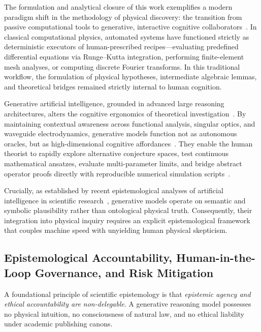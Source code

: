 \documentclass[11pt,a4paper]{article}
\begin{document}
The formulation and analytical closure of this work exemplifies a modern paradigm shift in the methodology of physical discovery: the transition from passive computational tools to generative, interactive cognitive collaborators~\cite{OToole2024,VillaescusaNavarro2026}. In classical computational physics, automated systems have functioned strictly as deterministic executors of human-prescribed recipes---evaluating predefined differential equations via Runge--Kutta integration, performing finite-element mesh analyses, or computing discrete Fourier transforms. In this traditional workflow, the formulation of physical hypotheses, intermediate algebraic lemmas, and theoretical bridges remained strictly internal to human cognition.

Generative artificial intelligence, grounded in advanced large reasoning architectures, alters the cognitive ergonomics of theoretical investigation~\cite{OToole2024,Haber2025,Jauhiainen2026}. By maintaining contextual awareness across functional analysis, singular optics, and waveguide electrodynamics, generative models function not as autonomous oracles, but as high-dimensional cognitive affordances~\cite{OToole2024,VillaescusaNavarro2026}. They enable the human theorist to rapidly explore alternative conjecture spaces, test continuous mathematical ansatzes, evaluate multi-parameter limits, and bridge abstract operator proofs directly with reproducible numerical simulation scripts~\cite{Zhu2026PaperBanana}.

Crucially, as established by recent epistemological analyses of artificial intelligence in scientific research~\cite{Haber2025,Jauhiainen2026}, generative models operate on semantic and symbolic plausibility rather than ontological physical truth. Consequently, their integration into physical inquiry requires an explicit epistemological framework that couples machine speed with unyielding human physical skepticism.

\subsection{Epistemological Accountability, Human-in-the-Loop Governance, and Risk Mitigation}
\label{subsec:epistemic_accountability}

A foundational principle of scientific epistemology is that \emph{epistemic agency and ethical accountability are non-delegable}. A generative reasoning model possesses no physical intuition, no consciousness of natural law, and no ethical liability under academic publishing canons.
\end{document}
